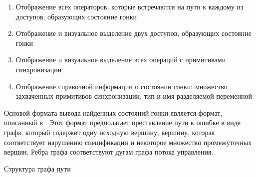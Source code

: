 \begin{enumerate}

\item Отображение всех операторов, которые встречаются на пути к каждому из доступов, образующих состояние гонки

\item Отображение и визуальное выделение двух доступов, образующих состояние гонки

\item Отображение и визуальное выделение всех операций с примитивами синхронизации

\item Отображение справочной информации о состоянии гонки: множество захваченных примитивов синхронизации, тип и имя разделяемой переменной

\end{enumerate}

Основой формата вывода найденных состояний гонки является формат, описанный в .
Этот формат предполагает преставление пути к ошибке в виде графа, который содержит одну исходную вершину, вершину, которая соответствует нарушению спецификации и некоторое множество промежуточных вершин.
Ребра графа соответствуют дугам графа потока управления.

Структура графа пути


\clearpage